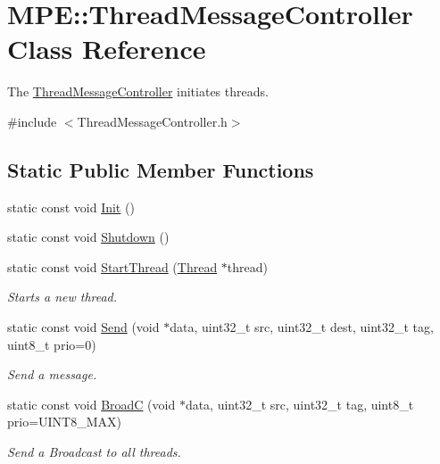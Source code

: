 \hypertarget{class_m_p_e_1_1_thread_message_controller}{}\section{M\+PE\+:\+:Thread\+Message\+Controller Class Reference}
\label{class_m_p_e_1_1_thread_message_controller}


The \hyperlink{class_m_p_e_1_1_thread_message_controller}{Thread\+Message\+Controller} initiates threads.  




{\ttfamily \#include $<$Thread\+Message\+Controller.\+h$>$}

\subsection*{Static Public Member Functions}
\begin{DoxyCompactItemize}
\item 
static const void \hyperlink{class_m_p_e_1_1_thread_message_controller_a74948fc34511a9c393994be2ebd8316e}{Init} ()
\item 
static const void \hyperlink{class_m_p_e_1_1_thread_message_controller_a40d05ce8e2ec218e549ea01b42c7b0bd}{Shutdown} ()
\item 
static const void \hyperlink{class_m_p_e_1_1_thread_message_controller_a614845d564c92a28b148d66a2008755e}{Start\+Thread} (\hyperlink{class_m_p_e_1_1_thread}{Thread} $\ast$thread)
\begin{DoxyCompactList}\small\item\em Starts a new thread. \end{DoxyCompactList}\item 
static const void \hyperlink{class_m_p_e_1_1_thread_message_controller_afcc8f572cd1355df9e6a0ef8e2d0f710}{Send} (void $\ast$data, uint32\+\_\+t src, uint32\+\_\+t dest, uint32\+\_\+t tag, uint8\+\_\+t prio=0)
\begin{DoxyCompactList}\small\item\em Send a message. \end{DoxyCompactList}\item 
static const void \hyperlink{class_m_p_e_1_1_thread_message_controller_a3585e277495c8eec3926d455b433e99c}{BroadC} (void $\ast$data, uint32\+\_\+t src, uint32\+\_\+t tag, uint8\+\_\+t prio=U\+I\+N\+T8\+\_\+\+M\+AX)
\begin{DoxyCompactList}\small\item\em Send a Broadcast to all threads. \end{DoxyCompactList}\end{DoxyCompactItemize}
